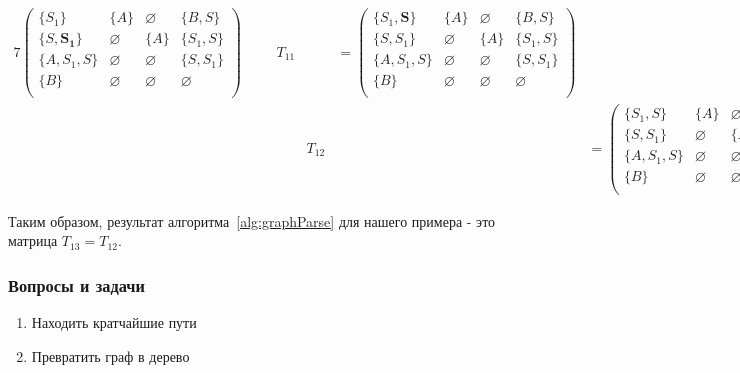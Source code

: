 \begin{example}
\begin{alignat*}{7}
\begin{pmatrix}
\{S_1\}     & \{A\}       & \varnothing & \{B, S\}    \\
\{S, \pmb{S_1}\}       & \varnothing & \{A\}       & \{S_1, S\}     \\
\{A, S_1, S\}  & \varnothing & \varnothing & \{S, S_1\} \\
\{B\}       & \varnothing & \varnothing & \varnothing \\
\end{pmatrix}  \ \ \ \  &&T_{11} &&= \begin{pmatrix}
\{S_1, \pmb{S}\}     & \{A\}       & \varnothing & \{B, S\}    \\
\{S, S_1\}       & \varnothing & \{A\}       & \{S_1, S\}     \\
\{A, S_1, S\}  & \varnothing & \varnothing & \{S, S_1\} \\
\{B\}       & \varnothing & \varnothing & \varnothing \\
\end{pmatrix} \\ & &&T_{12} &&= \begin{pmatrix}
\{S_1, S\}     & \{A\}       & \varnothing & \{B, S, \pmb{S_1}\}    \\
\{S, S_1\}       & \varnothing & \{A\}       & \{S_1, S\}     \\
\{A, S_1, S\}  & \varnothing & \varnothing & \{S, S_1\} \\
\{B\}       & \varnothing & \varnothing & \varnothing \\
\end{pmatrix} \ \ \ \ &&T_{13} &&= \begin{pmatrix}
\{S_1, S\}     & \{A\}       & \varnothing & \{B, S, S_1\}    \\
\{S, S_1\}       & \varnothing & \{A\}       & \{S_1, S\}     \\
\{A, S_1, S\}  & \varnothing & \varnothing & \{S, S_1\} \\
\{B\}       & \varnothing & \varnothing & \varnothing \\
\end{pmatrix}
\end{alignat*}

Таким образом, результат алгоритма~\ref{alg:graphParse} для нашего примера - это матрица $T_{13} = T_{12}$. 

\end{example}

\subsubsection{Вопросы и задачи}
\begin{enumerate}
	\item Находить кратчайшие пути
	\item Превратить граф в дерево
\end{enumerate}

